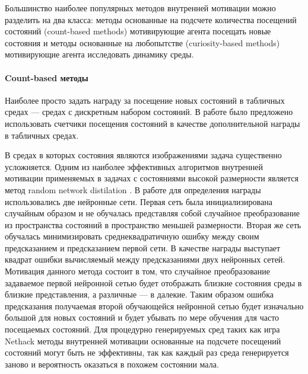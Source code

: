 Большинство наиболее популярных методов внутренней мотивации можно разделить на два класса: методы основанные на подсчете количества посещений состояний (count-based methods) мотивирующие агента посещать новые состояния и методы основанные на любопытстве (curiosity-based methods) мотивирующие агента исследовать динамику среды. 

\paragraph{Count-based методы} Наиболее просто задать награду за посещение новых состояний в табличных средах --- средах с дискретным набором состояний. В работе \cite{Strehl2008} было предложено использовать счетчики посещения состояний в качестве дополнительной награды в табличных средах. 

В средах в которых состояния являются изображениями задача существенно усложняется. Одним из наиболее эффективных алгоритмов внутренней мотивации применяемых в задачах с состояниями высокой размерности является метод random network distilation \cite{rnd}.
В работе \cite{rnd} для определения награды использовались две нейронные сети. Первая сеть была инициализирована случайным образом и не обучалась представляя собой случайное преобразование из пространства состояний в пространство меньшей размерности. Вторая же сеть обучалась минимизировать среднеквадратичную ошибку между своим предсказанием и предсказанием первой сети. В качестве награды выступает квадрат ошибки вычисляемый между предсказаниями двух нейронных сетей. Мотивация данного метода состоит в том, что случайное преобразование задаваемое первой нейронной сетью будет отображать близкие состояния среды в близкие представления, а различные --- в далекие. Таким образом ошибка предсказания получаемая второй обучающейся нейронной сетью будет изначально большой для новых состояний и будет убывать по мере обучения для часто посещаемых состояний. 
Для процедурно генерируемых сред таких как игра Nethack \cite{nethack} методы внутренней мотивации основанные на подсчете посещений состояний могут быть не эффективны, так как каждый раз среда генерируется заново и вероятность оказаться в похожем состоянии мала.

